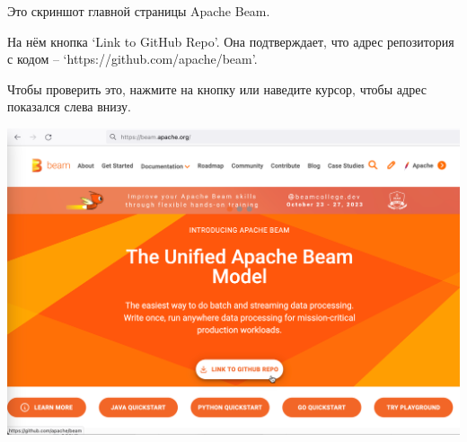 
Это скриншот главной страницы Apache Beam.

На нём кнопка `Link to GitHub Repo'.
Она подтверждает, что адрес репозитория с кодом -- `https://github.com/apache/beam'.

Чтобы проверить это, нажмите на кнопку или наведите курсор,
чтобы адрес показался слева внизу.

\includegraphics[width=\textwidth]{beam-home}

\pagebreak
